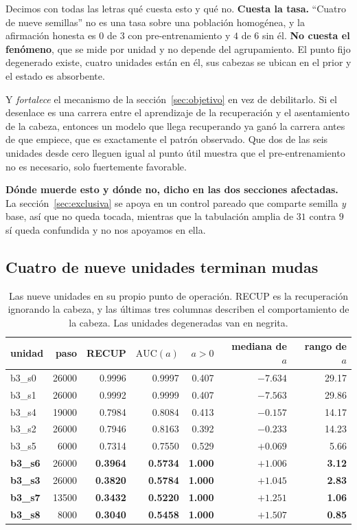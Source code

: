 \documentclass[11pt,a4paper]{article}
\begin{document}
Decimos con todas las letras qué cuesta esto y qué no. \textbf{Cuesta la tasa.} ``Cuatro de nueve
semillas'' no es una tasa sobre una población homogénea, y la afirmación honesta es $0$ de $3$ con
pre-entrenamiento y $4$ de $6$ sin él. \textbf{No cuesta el fenómeno}, que se mide por unidad y no
depende del agrupamiento. El punto fijo degenerado existe, cuatro unidades están en él, sus cabezas se
ubican en el prior y el estado es absorbente.

Y \emph{fortalece} el mecanismo de la sección~\ref{sec:objetivo} en vez de debilitarlo. Si el desenlace
es una carrera entre el aprendizaje de la recuperación y el asentamiento de la cabeza, entonces un
modelo que llega recuperando ya ganó la carrera antes de que empiece, que es exactamente el patrón
observado. Que dos de las seis unidades desde cero lleguen igual al punto útil muestra que el
pre-entrenamiento no es necesario, solo fuertemente favorable.

\textbf{Dónde muerde esto y dónde no, dicho en las dos secciones afectadas.} La
sección~\ref{sec:exclusiva} se apoya en un control pareado que comparte semilla \emph{y} base, así que
no queda tocada, mientras que la tabulación amplia de $31$ contra $9$ sí queda confundida y no nos
apoyamos en ella.

\subsection{Cuatro de nueve unidades terminan mudas}
\label{sec:mudas}

\begin{table}[h]
\centering
\caption{Las nueve unidades en su propio punto de operación. RECUP es la recuperación ignorando la
cabeza, y las últimas tres columnas describen el comportamiento de la cabeza. Las unidades degeneradas
van en negrita.}
\begin{tabular}{lrrrrrr}
\toprule
unidad & paso & RECUP & $\mathrm{AUC}(a)$ & $a > 0$ & mediana de $a$ & rango de $a$ \\
\midrule
b3\_s0 & 26000 & 0.9996 & 0.9997 & 0.407 & $-7.634$ & 29.17 \\
b3\_s1 & 26000 & 0.9992 & 0.9999 & 0.407 & $-7.563$ & 29.86 \\
b3\_s4 & 19000 & 0.7984 & 0.8084 & 0.413 & $-0.157$ & 14.17 \\
b3\_s2 & 26000 & 0.7946 & 0.8163 & 0.392 & $-0.233$ & 14.23 \\
b3\_s5 & 6000  & 0.7314 & 0.7550 & 0.529 & $+0.069$ & 5.66 \\
\midrule
\textbf{b3\_s6} & 26000 & \textbf{0.3964} & \textbf{0.5734} & \textbf{1.000} & $+1.006$ & \textbf{3.12} \\
\textbf{b3\_s3} & 26000 & \textbf{0.3820} & \textbf{0.5784} & \textbf{1.000} & $+1.045$ & \textbf{2.83} \\
\textbf{b3\_s7} & 13500 & \textbf{0.3432} & \textbf{0.5220} & \textbf{1.000} & $+1.251$ & \textbf{1.06} \\
\textbf{b3\_s8} & 8000  & \textbf{0.3040} & \textbf{0.5458} & \textbf{1.000} & $+1.507$ & \textbf{0.85} \\
\bottomrule
\end{tabular}
\label{tab:nueve}
\end{table}
\end{document}
